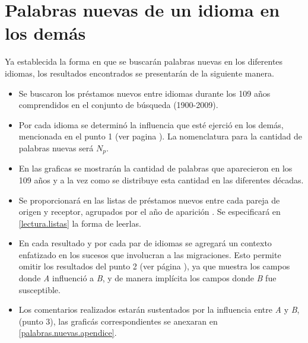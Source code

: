 \section{Palabras nuevas de un idioma en los demás} %
 

Ya establecida la forma en que se buscarán  palabras nuevas en los diferentes idiomas,  los resultados encontrados se presentarán de la siguiente manera.

\begin{itemize}

\item Se buscaron los préstamos nuevos entre idiomas durante los 109 años comprendidos en el conjunto de búsqueda (1900-2009).
	
\item Por cada idioma se determinó la influencia que esté ejerció en los demás, mencionada en el punto 1 (ver pagina \pageref{proceso.nuevos}). La nomenclatura para la cantidad de palabras nuevas será $N_{p}$.



\item En las graficas se mostrarán la cantidad de palabras que aparecieron en los 109 años y a la vez como se distribuye esta cantidad en las diferentes décadas. 

\item Se proporcionará en \cite{prestamos_nuevos} las listas  de préstamos nuevos entre cada pareja de origen y receptor, agrupados por el año de aparición .  Se especificará en \ref{lectura.listas}  la forma de leerlas.

\item En cada resultado y por cada par de idiomas se agregará un contexto enfatizado en los sucesos  que involucran a las migraciones. Esto permite omitir los resultados del punto 2 (ver  página \pageref{proceso.nuevos}), ya que muestra los campos donde \textit{A} influenció a  \textit{B}, y  de manera implícita los campos donde \textit{B} fue susceptible.

\item Los comentarios realizados estarán sustentados por la influencia entre \textit{A} y \textit{B}, (punto 3), las graficás correspondientes se anexaran en \ref{palabras.nuevas.apendice}. 

\end{itemize}

